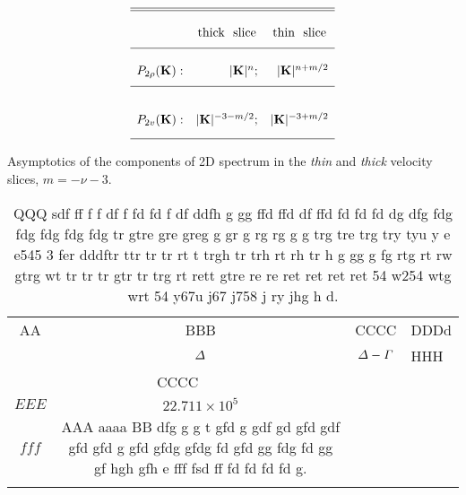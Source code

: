 
\begin{table}[h]
\begin{displaymath}
\begin{array}{lrr} \hline\hline\\
& \multicolumn{1}{c}{\rm thick~~slice}  &
\multicolumn{1}{c}{\rm thin~~slice}
\\[2mm] \hline \\
P_{2\rho}({\bf K}): &
|{\bf K}|^n;
&|{\bf K}|^{n+m/2} \\[2mm] 
\hline \\[3mm]
P_{2v}({\bf K}): & |{\bf K}|^{-3-m/2}; &
|{\bf K}|^{-3+m/2} \\[3mm] \hline
\end{array}
\end{displaymath}
\caption{Asymptotics of the  components of 2D spectrum in the {\it thin}
and {\it thick} velocity slices, $m=-\nu-3$.} 
\label{tab:2Dspk_asymp}
\end{table}

\begin{table}[h]
\begin{center}
\begin{tabular}{|c|c|c|l|}
\hline
AA&BBB &CCCC &DDDd \\
&$\mit\Delta$ &
$\mit\Delta-\Gamma$&HHH
\\ \hline
\multicolumn{2}{|c|}{CCCC} & & \\
\cline{1-2}
$EEE$ &
$22.711 \times 10^5$ &
\begin{minipage}{1in}
$WWWw$ \\ $fff$ 
\end{minipage} &
\begin{minipage}{1.5in}
AAA aaaa BB dfg g g t   gfd g gdf gd gfd gdf gfd gfd g gfd gfdg
gfdg fd gfd gg fdg fd gg gf hgh gfh e fff fsd ff fd fd fd fd g.
\end{minipage} \\ 
& & & \\ \hline
\end{tabular}
\end{center}
\caption{QQQ sdf ff f f df  f fd fd f df ddfh  g gg  ffd ffd df
ffd fd fd fd  dg dfg fdg fdg fdg fdg fdg tr gtre gre greg  g gr
g rg rg g g trg tre trg try tyu y e e545 3 fer  dddftr ttr tr tr
rt  t trgh tr trh rt rh tr h g gg g fg rtg rt rw  gtrg wt tr tr
tr gtr tr trg rt rett gtre re re ret ret ret ret 54  w254 wtg
wrt 54 y67u j67 j758 j ry jhg h  d.}
\label{tab:exp}
\end{table}

